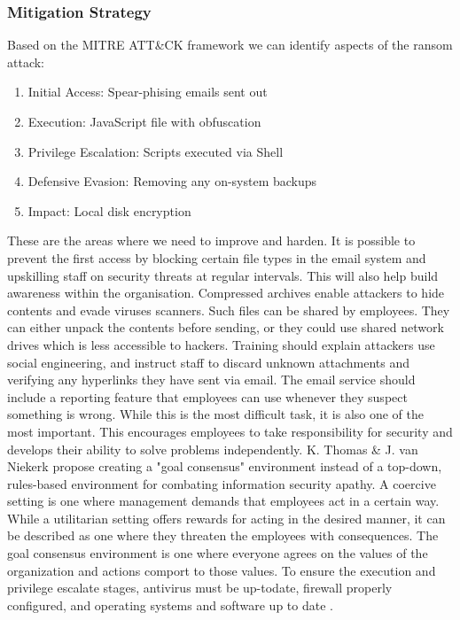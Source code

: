 \subsubsection{Mitigation Strategy}
Based on the MITRE ATT\&CK \cite{mitre} framework we can identify aspects of the ransom attack:

\begin{enumerate}
    \item Initial Access: Spear-phising emails sent out
    \item Execution: JavaScript file with obfuscation
    \item Privilege Escalation: Scripts executed via Shell
    \item Defensive Evasion: Removing any on-system backups
    \item Impact: Local disk encryption
\end{enumerate}

These are the areas where we need to improve and harden. It is possible to prevent the first access by blocking certain file types in the email system and upskilling staff on security threats at regular intervals. This will also help build awareness within the organisation. Compressed archives enable attackers to hide contents and evade viruses scanners. Such files can be shared by employees. They can either unpack the contents before sending, or they could use shared network drives which is less accessible to hackers. Training should explain attackers use social engineering, and instruct staff to discard unknown attachments and verifying any hyperlinks they have sent via email. The email service should include a reporting feature that employees can use whenever they suspect something is wrong. While this is the most difficult task, it is also one of the most important. This encourages employees to take responsibility for security and develops their ability to solve problems independently. K. Thomas \& J. van Niekerk \cite{thomson_niekerk_2012} propose creating a "goal consensus" environment instead of a top-down, rules-based environment for combating information security apathy. A coercive setting is one where management demands that employees act in a certain way. While a utilitarian setting offers rewards for acting in the desired manner, it can be described as one where they threaten the employees with consequences. The goal consensus environment is one where everyone agrees on the values of the organization and actions comport to those values. To ensure the execution and privilege escalate stages, antivirus must be up-todate, firewall properly configured, and operating systems and software up to date \cite{saxena_soni_2018}.

